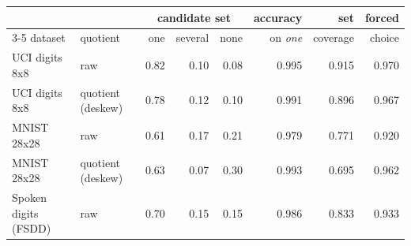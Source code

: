 \begin{tabular}{llrrrrrr}
\toprule
& & \multicolumn{3}{c}{candidate set} & accuracy & set & forced \\
\cmidrule(lr){3-5}
dataset & quotient & one & several & none & on \emph{one} & coverage & choice \\
\midrule
UCI digits 8x8 & raw & 0.82 & 0.10 & 0.08 & 0.995 & 0.915 & 0.970 \\
UCI digits 8x8 & quotient (deskew) & 0.78 & 0.12 & 0.10 & 0.991 & 0.896 & 0.967 \\
MNIST 28x28 & raw & 0.61 & 0.17 & 0.21 & 0.979 & 0.771 & 0.920 \\
MNIST 28x28 & quotient (deskew) & 0.63 & 0.07 & 0.30 & 0.993 & 0.695 & 0.962 \\
Spoken digits (FSDD) & raw & 0.70 & 0.15 & 0.15 & 0.986 & 0.833 & 0.933 \\
\bottomrule
\end{tabular}
